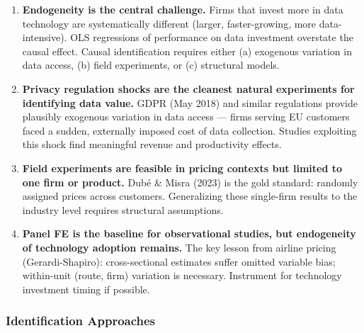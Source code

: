 \documentclass[
]{article}
\begin{document}
\begin{enumerate}
\def\labelenumi{\arabic{enumi}.}
\item
  \textbf{Endogeneity is the central challenge.} Firms that invest more
  in data technology are systematically different (larger,
  faster-growing, more data-intensive). OLS regressions of performance
  on data investment overstate the causal effect. Causal identification
  requires either (a) exogenous variation in data access, (b) field
  experiments, or (c) structural models.
\item
  \textbf{Privacy regulation shocks are the cleanest natural experiments
  for identifying data value.} GDPR (May 2018) and similar regulations
  provide plausibly exogenous variation in data access --- firms serving
  EU customers faced a sudden, externally imposed cost of data
  collection. Studies exploiting this shock find meaningful revenue and
  productivity effects.
\item
  \textbf{Field experiments are feasible in pricing contexts but limited
  to one firm or product.} Dubé \& Misra (2023) is the gold standard:
  randomly assigned prices across customers. Generalizing these
  single-firm results to the industry level requires structural
  assumptions.
\item
  \textbf{Panel FE is the baseline for observational studies, but
  endogeneity of technology adoption remains.} The key lesson from
  airline pricing (Gerardi-Shapiro): cross-sectional estimates suffer
  omitted variable bias; within-unit (route, firm) variation is
  necessary. Instrument for technology investment timing if possible.
\end{enumerate}

\hypertarget{identification-approaches}{%
\subsubsection{Identification
Approaches}\label{identification-approaches}}
\end{document}
